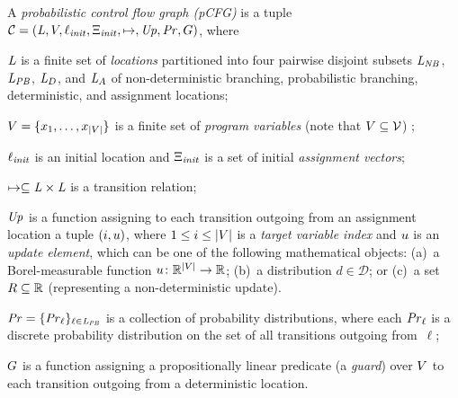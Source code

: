 \smallskip
\begin{definition}
\label{def:stochgame}
A \emph{probabilistic control flow graph (pCFG)} is a tuple
$\mathcal{C}=(\mathit{L},V,\ell_{\mathit{init}},\Xi_{\mathit{init}},\mapsto,\mathit{Up},\mathit{Pr},G)$,
where
\begin{compactitem}
\item $\mathit{L}$ is a finite set of \emph{locations} partitioned into four 
pairwise
disjoint subsets  $\mathit{L}_{\mathit{NB}}$, $\mathit{L}_{\mathit{PB}}$, $\mathit{L}_D$, and $\mathit{L}_A$ of 
non-deterministic branching, 
probabilistic branching, deterministic, and assignment locations;
\item $V=\{x_1,\dots,x_{|V|}\}$ is a finite set of \emph{program 
variables} (note that $V \subseteq \mathcal{V}$) ;
\item $\ell_{\mathit{init}}$ is an initial location and $\Xi_{\mathit{init}}$ is a set of initial 
\emph{assignment vectors};
\item $\mapsto\subseteq\mathit{L}\times\mathit{L}$ is a transition relation;
\item $\mathit{Up}$ is a function assigning to each transition outgoing from an 
assignment location a tuple $(i,u)$, where $1\leq i \leq |V|$ is a 
\emph{target 
	variable index} and $u$ 
is an 
\emph{update element}, which can 
be one of the following mathematical objects: %
(a)~a Borel-measurable function $u\colon \mathbb{R}^{|V|}\rightarrow \mathbb{R}$;
(b)~a distribution $d\in \mathcal{D}$; or
(c)~a set $R\subseteq \mathbb{R}$ (representing a non-deterministic update).
\item $\mathit{Pr}=\{\mathit{Pr}_{\ell}\}_{\ell \in \mathit{L}_{\mathit{PB}}}$ is a collection of
probability distributions, where each $\mathit{Pr}_{\ell}$ is a discrete probability
distribution on the set of all transitions outgoing from~$\ell$;
\item $G$ is a function assigning a propositionally linear predicate
(a \emph{guard}) over $V$ to each transition outgoing from a deterministic 
location.
\end{compactitem}


\end{definition}
